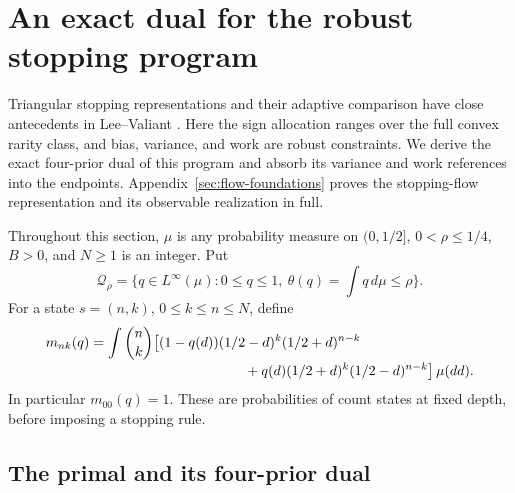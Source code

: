 \section{An exact dual for the robust stopping program}
\label{sec:exact-dual}

Triangular stopping representations and their adaptive comparison have
close antecedents in Lee--Valiant \cite{lv}. Here the sign allocation
ranges over the full convex rarity class, and bias, variance, and work
are robust constraints. We derive the exact four-prior dual of this
program and absorb its variance and work references into the endpoints.
Appendix~\ref{sec:flow-foundations} proves the stopping-flow representation
and its observable realization in full.

Throughout this section, $\mu$ is any probability measure on $(0,1/2]$,
$0<\rho\le1/4$, $B>0$, and $N\ge1$ is an integer. Put
\[
 \mathcal Q_\rho=\{q\in L^\infty(\mu):0\le q\le1,\
                \theta(q)=\textstyle\int q\,d\mu\le\rho\}.
\]
For a state $s=(n,k)$, $0\le k\le n\le N$, define
\begin{align}
 m_{nk}(q)&=\int\binom nk\bigl[
 (1-q(d))(1/2-d)^k(1/2+d)^{n-k}\notag\\[-2pt]
 &\hspace{39mm}+q(d)(1/2+d)^k(1/2-d)^{n-k}\bigr]\,\mu(dd).
 \label{eq:dual-count-coefficients}
\end{align}
In particular $m_{00}(q)=1$. These are probabilities of count states at
fixed depth, before imposing a stopping rule.

\subsection{The primal and its four-prior dual}

